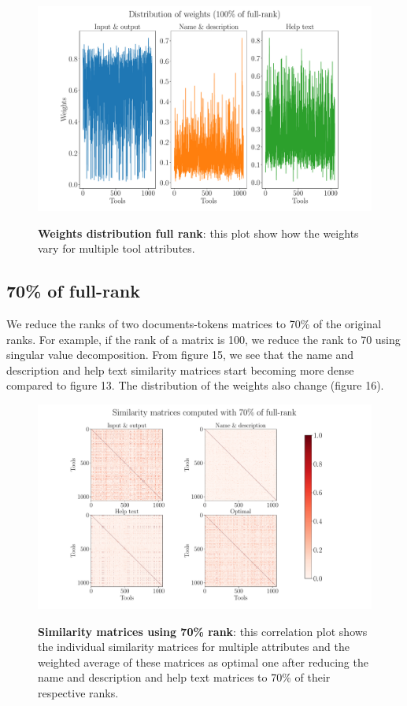 \begin{figure}[h]
\begin{centering}
    {\includegraphics[scale=0.35]{figures/Weights_100.pdf}}
    \caption[Weights distribution full rank]{\textbf{Weights distribution full rank}: this plot show how the weights vary for multiple tool attributes.}
\end{centering}
\end{figure}

\subsection{70\% of full-rank}
We reduce the ranks of two documents-tokens matrices to 70\% of the original ranks. For example, if the rank of a matrix is 100, we reduce the rank to 70 using singular value decomposition. From figure 15, we see that the name and description and help text similarity matrices start becoming more dense compared to figure 13. The distribution of the weights also change (figure 16).

\begin{figure}[h]
\begin{centering}
    {\includegraphics[scale=0.35]{figures/Similarity_matrices_070.pdf}}
    \caption[Similarity matrices 70\% rank]{\textbf{Similarity matrices using 70\% rank}: this correlation plot shows the individual similarity matrices for multiple attributes and the weighted average of these matrices as optimal one after reducing the name and description and help text matrices to 70\% of their respective ranks.}
\end{centering}
\end{figure}

